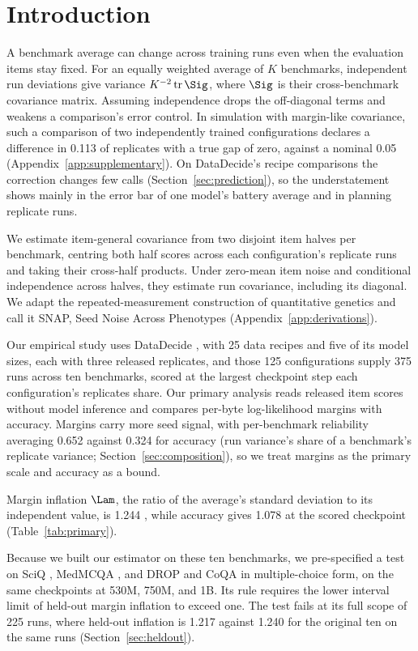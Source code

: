 \section{Introduction}
A benchmark average can change across training runs even when the evaluation items stay fixed. For an equally weighted average of $K$ benchmarks, independent run deviations give variance $K^{-2}\operatorname{tr}\Sig$, where $\Sig$ is their cross-benchmark covariance matrix. Assuming independence drops the off-diagonal terms and weakens a comparison's error control. In simulation with margin-like covariance, such a comparison of two independently trained configurations declares a difference in 0.113 of replicates with a true gap of zero, against a nominal 0.05 (Appendix~\ref{app:supplementary}). On DataDecide's recipe comparisons the correction changes few calls (Section~\ref{sec:prediction}), so the understatement shows mainly in the error bar of one model's battery average and in planning replicate runs.

We estimate item-general covariance from two disjoint item halves per benchmark, centring both half scores across each configuration's replicate runs and taking their cross-half products. Under zero-mean item noise and conditional independence across halves, they estimate run covariance, including its diagonal. We adapt the repeated-measurement construction of quantitative genetics and call it SNAP, Seed Noise Across Phenotypes (Appendix~\ref{app:derivations}).

Our empirical study uses DataDecide \citep{magnusson2025}, with 25 data recipes and five of its model sizes, each with three released replicates, and those 125 configurations supply 375 runs across ten benchmarks, scored at the largest checkpoint step each configuration's replicates share. Our primary analysis reads released item scores without model inference and compares per-byte log-likelihood margins with accuracy. Margins carry more seed signal, with per-benchmark reliability averaging 0.652 against 0.324 for accuracy (run variance's share of a benchmark's replicate variance; Section~\ref{sec:composition}), so we treat margins as the primary scale and accuracy as a bound.

Margin inflation $\Lam$, the ratio of the average's standard deviation to its independent value, is 1.244 , while accuracy gives 1.078  at the scored checkpoint (Table~\ref{tab:primary}).

Because we built our estimator on these ten benchmarks, we pre-specified a test on SciQ \citep{welbl2017sciq}, MedMCQA \citep{pal2022medmcqa}, and DROP \citep{dua2019drop} and CoQA \citep{reddy2019coqa} in multiple-choice form, on the same checkpoints at 530M, 750M, and 1B. Its rule requires the lower interval limit of held-out margin inflation to exceed one. The test fails at its full scope of 225 runs, where held-out inflation is 1.217  against 1.240  for the original ten on the same runs (Section~\ref{sec:heldout}).


